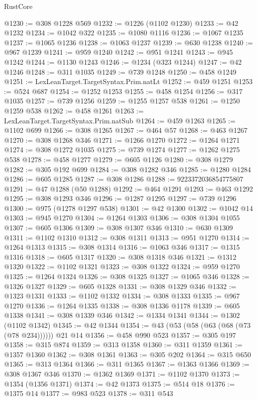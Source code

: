 \begin{lexlean}{RustCore}
\begin{coremodule}
@1230 := @308 @1228 @569
@1232 := @1226 (@1102 @1230)
@1233 := @42 @1232
@1234 := @1042 @322
@1235 := @1080 @1116
@1236 := @1067 @1235
@1237 := @1065 @1236
@1238 := @1063 @1237
@1239 := @630 @1238
@1240 := @967 @1239
@1241 := @959 @1240
@1242 := @951 @1241
@1243 := @945 @1242
@1244 := @1130 @1243
@1246 := @1234 (@323 @1244)
@1247 := @42 @1246
@1248 := @311 @1035
@1249 := @739 @1248
@1250 := @458 @1249
@1251 := LexLeanTarget.TargetSyntax.Prim.natLt
@1252 := @459 @1251
@1253 := @524 @687
@1254 := @1252 @1253
@1255 := @458 @1254
@1256 := @317 @1035
@1257 := @739 @1256
@1259 := @1255 @1257 @538
@1261 := @1250 @1259 @538
@1262 := @458 @1261
@1263 := LexLeanTarget.TargetSyntax.Prim.natSub
@1264 := @459 @1263
@1265 := @1102 @699
@1266 := @308 @1265
@1267 := @464 @57
@1268 := @463 @1267
@1270 := @308 @1268 @346
@1271 := @1266 @1270
@1272 := @1264 @1271
@1274 := @308 @1272 @1035
@1275 := @739 @1274
@1277 := @1262 @1275 @538
@1278 := @458 @1277
@1279 := @605 @1126
@1280 := @308 @1279
@1282 := @305 @192 @699
@1284 := @308 @1282 @346
@1285 := @1280 @1284
@1286 := @605 @1285
@1287 := @308 @1286
@1288 := 9223372036854775807
@1291 := @47 @1288 (@50 @1288)
@1292 := @464 @1291
@1293 := @463 @1292
@1295 := @308 @1293 @346
@1296 := @1287 @1295
@1297 := @739 @1296
@1300 := @975 (@1278 @1297 @538)
@1301 := @42 @1300
@1302 := @1042 @14
@1303 := @945 @1270
@1304 := @1264 @1303
@1306 := @308 @1304 @1055
@1307 := @605 @1306
@1309 := @308 @1307 @346
@1310 := @630 @1309
@1311 := @1102 @1310
@1312 := @308 @1311
@1313 := @951 @1270
@1314 := @1264 @1313
@1315 := @308 @1314
@1316 := @1063 @346
@1317 := @1315 @1316
@1318 := @605 @1317
@1320 := @308 @1318 @346
@1321 := @1312 @1320
@1322 := @1102 @1321
@1323 := @308 @1322
@1324 := @959 @1270
@1325 := @1264 @1324
@1326 := @308 @1325
@1327 := @1065 @346
@1328 := @1326 @1327
@1329 := @605 @1328
@1331 := @308 @1329 @346
@1332 := @1323 @1331
@1333 := @1102 @1332
@1334 := @308 @1333
@1335 := @967 @1270
@1336 := @1264 @1335
@1338 := @308 @1336 @1178
@1339 := @605 @1338
@1341 := @308 @1339 @346
@1342 := @1334 @1341
@1344 := @1302 (@1102 @1342)
@1345 := @42 @1344
@1354 := @43 (@53 (@58 (@63 (@68 (@73 (@78 @234)))))) @21 @14
@1356 := @458 @990 @523
@1357 := @305 @197
@1358 := @315 @874
@1359 := @313 @1358
@1360 := @311 @1359
@1361 := @1357 @1360
@1362 := @308 @1361
@1363 := @305 @202
@1364 := @315 @650
@1365 := @313 @1364
@1366 := @311 @1365
@1367 := @1363 @1366
@1369 := @308 @1367 @346
@1370 := @1362 @1369
@1371 := @1102 @1370
@1373 := @1354 (@1356 @1371)
@1374 := @42 @1373
@1375 := @514 @18
@1376 := @1375 @14
@1377 := @983 @523
@1378 := @311 @543

\end{coremodule}
\end{lexlean}
